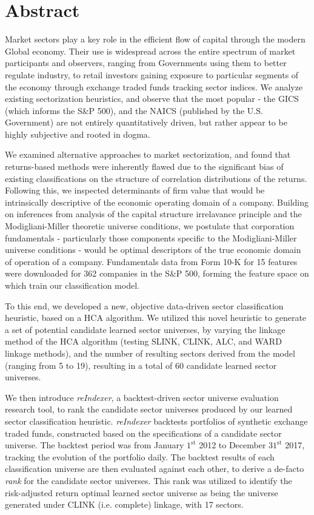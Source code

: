 \documentclass[../main.tex]{subfiles}
\begin{document}
\section*{Abstract}

Market sectors play a key role in the efficient flow of capital through the modern Global economy. Their use is widespread across the entire spectrum of market participants and observers, ranging from Governments using them to better regulate industry, to retail investors gaining exposure to particular segments of the economy through exchange traded funds tracking sector indices. We analyze existing sectorization heuristics, and observe that the most popular - the GICS (which informs the S\&P 500), and the NAICS (published by the U.S. Government) are not entirely quantitatively driven, but rather appear to be highly subjective and rooted in dogma.

We examined alternative approaches to market sectorization, and found that returns-based methods were inherently flawed due to the significant bias of existing classifications on the structure of correlation distributions of the returns. Following this, we inspected determinants of firm value that would be intrinsically descriptive of the economic operating domain of a company. Building on inferences from analysis of the capital structure irrelavance principle and the Modigliani-Miller theoretic universe conditions, we postulate that corporation fundamentals - particularly those components specific to the Modigliani-Miller universe conditions - would be optimal descriptors of the true economic domain of operation of a company. Fundamentals data from Form 10-K for 15 features were downloaded for 362 companies in the S\&P 500, forming the feature space on which train our classification model.

To this end, we developed a new, objective data-driven sector classification heuristic, based on a HCA algorithm. We utilized this novel heuristic to generate a set of potential candidate learned sector universes, by varying the linkage method of the HCA algorithm (testing SLINK, CLINK, ALC, and WARD linkage methods), and the number of resulting sectors derived from the model (ranging from 5 to 19), resulting in a total of 60 candidate learned sector universes.

We then introduce \textit{reIndexer}, a backtest-driven sector universe evaluation research tool, to rank the candidate sector universes produced by our learned sector classification heuristic. \textit{reIndexer} backtests portfolios of synthetic exchange traded funds, constructed based on the specifications of a candidate sector universe. The backtest period was from January $1^\text{st}$ 2012 to December $31^\text{st}$ 2017, tracking the evolution of the portfolio daily. The backtest results of each classification universe are then evaluated against each other, to derive a de-facto \textit{rank} for the candidate sector universes. This rank was utilized to identify the risk-adjusted return optimal learned sector universe as being the universe generated under CLINK (i.e. complete) linkage, with 17 sectors.
\end{document}

